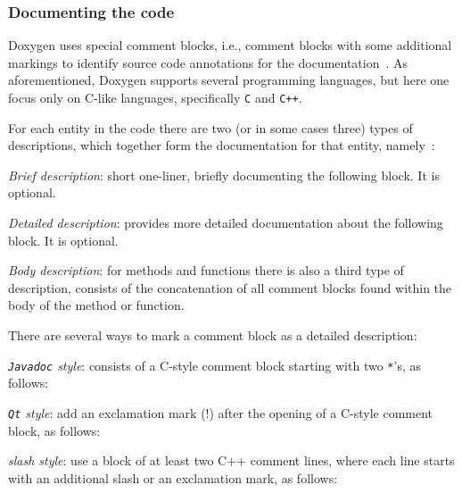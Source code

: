 \subsubsection{Documenting the code}
\label{sec:documenting-code}
Doxygen uses special comment blocks, i.e., comment blocks with some
additional markings to identify source code annotations for the
documentation~\cite{doxygenDocBlocks}. As aforementioned, Doxygen supports several programming
languages, but here one focus only on C-like languages, specifically \texttt{C}
and \texttt{C++}.

For each entity in the code there are two (or in some cases three) types of descriptions, which together form
the documentation for that entity, namely~\cite{doxygenDocBlocks}:
\begin{enum-c}
\item \emph{Brief description}: short one-liner, briefly documenting the
  following block. It is optional.
\item \emph{Detailed description}: provides more detailed documentation about
  the following block. It is optional.
\item \emph{Body description}:
for methods and functions there is also a third type of description, consists of
the concatenation of all comment blocks found within the body of the method or
function.
\end{enum-c}

There are several ways to mark a comment block as a detailed description:
\begin{enum-c}
\item \emph{\texttt{Javadoc} style}: 
  consists of a C-style comment block starting with two \texttt{*}'s, as follows:

\item \emph{\texttt{Qt} style}: add an exclamation mark (!) after the opening of
  a C-style comment block, as follows:

\item \emph{slash style}: use a block of at least two C++ comment lines, where
  each line starts with an additional slash or an exclamation mark, as follows:

\vspace{-.8em}  
\end{enum-c}

